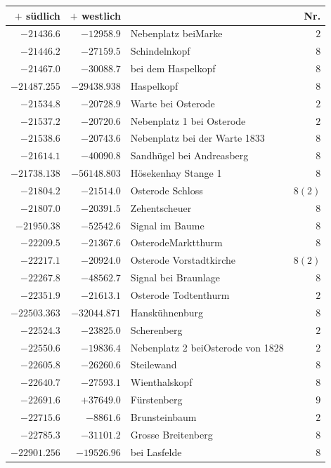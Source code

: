 \clearpage{}%
\begin{center}\begingroup\fontsize{8}{9}\selectfont
\setlength{\tabcolsep}{4pt}
\begin{tabular}{r|r|p{170pt}|r}\hline
\(+\) südlich&\(+\) westlich&&Nr.\\\hline
\(-21436.6\)&\(-12958.9\)&Nebenplatz beiMarke&\(2\)\\
\(-21446.2\)&\(-27159.5\)&Schindelnkopf&\(8\)\\
\(-21467.0\)&\(-30088.7\)&bei dem Haspelkopf&\(8\)\\
\(-21487.255\)&\(-29438.938\)&Haspelkopf&\(8\)\\
\(-21534.8\)&\(-20728.9\)&Warte bei Osterode&\(2\)\\
\(-21537.2\)&\(-20720.6\)&Nebenplatz 1 bei Osterode&\(2\)\\
\(-21538.6\)&\(-20743.6\)&Nebenplatz bei der Warte 1833&\(8\)\\
\(-21614.1\)&\(-40090.8\)&Sandhügel bei Andreasberg&\(8\)\\
\(-21738.138\)&\(-56148.803\)&Hösekenhay Stange 1&\(8\)\\
\(-21804.2\)&\(-21514.0\)&Osterode Schloss&\(8 (2)\)\\
\(-21807.0\)&\(-20391.5\)&Zehentscheuer&\(8\)\\
\(-21950.38\)&\(-52542.6\)&Signal im Baume&\(8\)\\
\(-22209.5\)&\(-21367.6\)&OsterodeMarktthurm&\(8\)\\
\(-22217.1\)&\(-20924.0\)&Osterode Vorstadtkirche&\(8 (2)\)\\
\(-22267.8\)&\(-48562.7\)&Signal bei Braunlage&\(8\)\\
\(-22351.9\)&\(-21613.1\)&Osterode Todtenthurm&\(2\)\\
\(-22503.363\)&\(-32044.871\)&Hanskühnenburg&\(8\)\\
\(-22524.3\)&\(-23825.0\)&Scherenberg&\(2\)\\
\(-22550.6\)&\(-19836.4\)&Nebenplatz 2 beiOsterode von 1828&\(2\)\\
\(-22605.8\)&\(-26260.6\)&Steilewand&\(8\)\\
\(-22640.7\)&\(-27593.1\)&Wienthalskopf&\(8\)\\
\(-22691.6\)&\(+37649.0\)&Fürstenberg&\(9\)\\
\(-22715.6\)&\(-8861.6\)&Brunsteinbaum&\(2\)\\
\(-22785.3\)&\(-31101.2\)&Grosse Breitenberg&\(8\)\\
\(-22901.256\)&\(-19526.96\)&bei Lasfelde&\(8\)\\

\end{tabular}
\end{center}
